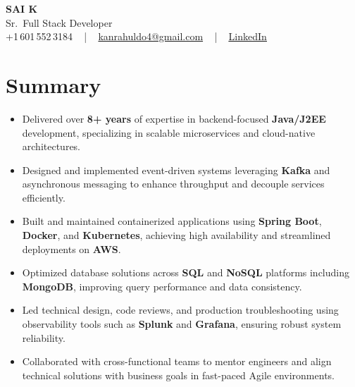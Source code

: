 \documentclass[letterpaper,11pt]{article}
\newcommand{\resumeItem}[1]{
  \item\footnotesize{
    {#1 \vspace{-2pt}}
  }
}
\newcommand{\resumeItemListStart}{\begin{itemize}[leftmargin=*]}
\newcommand{\resumeItemListEnd}{\end{itemize}\vspace{-5pt}}
\begin{document}
\begin{center}
    {\fontsize{14pt}{12pt}\selectfont \textbf{\MakeUppercase{Sai K}}}\\ \vspace{2pt}
    \fontsize{10pt}{12pt}\selectfont Sr.\ Full Stack Developer\\ \vspace{2pt}
    \fontsize{10pt}{12pt}\selectfont +1\,601\,552\,3184 ~ | ~
    \href{mailto:kanrahuldo4@gmail.com}{kanrahuldo4@gmail.com} ~ | ~
    \href{https://www.linkedin.com/in/srrrk/}{\color{blue}\underline{LinkedIn}}
    \vspace{-10pt}
\end{center}

\section{Summary}
\fontsize{9pt}{10pt}\selectfont
\resumeItemListStart
  \resumeItem{Delivered over \textbf{8+ years} of expertise in backend-focused \textbf{Java/J2EE} development, specializing in scalable microservices and cloud-native architectures.}
  \resumeItem{Designed and implemented event-driven systems leveraging \textbf{Kafka} and asynchronous messaging to enhance throughput and decouple services efficiently.}
  \resumeItem{Built and maintained containerized applications using \textbf{Spring Boot}, \textbf{Docker}, and \textbf{Kubernetes}, achieving high availability and streamlined deployments on \textbf{AWS}.}
  \resumeItem{Optimized database solutions across \textbf{SQL} and \textbf{NoSQL} platforms including \textbf{MongoDB}, improving query performance and data consistency.}
  \resumeItem{Led technical design, code reviews, and production troubleshooting using observability tools such as \textbf{Splunk} and \textbf{Grafana}, ensuring robust system reliability.}
  \resumeItem{Collaborated with cross-functional teams to mentor engineers and align technical solutions with business goals in fast-paced Agile environments.}
\resumeItemListEnd
\vspace{-6pt}

\end{document}
